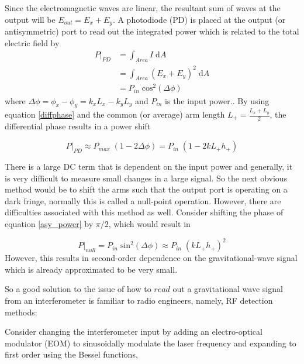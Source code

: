 		Since the electromagnetic waves are linear, the resultant sum of waves at the output will be $E_{out} = E_x + E_y$. A photodiode (PD) is placed at the output (or antisymmetric) port to read out the integrated power which is related to the total electric field by
		\begin{equation}
		\begin{aligned}\label{asy_power}
			P \vert_{PD}	&= \int_{Area} I \;				\text{d}A 
		\\					&= \int_{Area} (E_x + E_y)^2 \;	\text{d}A 
		\\					&= P_{in} \; \text{cos}^2(\Delta \phi)
		\end{aligned}
		\end{equation}	
		where $\Delta \phi = \phi_{x} - \phi_{y} = k_x L_x - k_y L_y$ and $P_{in}$ is the input power.. By using equation \ref{diffphase} and the common (or average) arm length $L_{+} = \frac{L_x + L_y}{2}$, the differential phase results in a power shift
		
		\begin{equation}
		P \vert_{PD} \approx P_{max} \; (1-2 \Delta \phi) = P_{in} \; (1-2 k L_{+} h_{+})
		\end{equation}
		
		There is a large DC term that is dependent on the input power and generally, it is very difficult to measure small changes in a large signal. So the next obvious method would be to shift the arms such that the output port is operating on a dark fringe, normally this is called a null-point operation.  However, there are difficulties associated with this method as well.  Consider shifting the phase of equation \ref{asy_power} by $\pi/2$, which would result in
		
		\begin{equation}\label{null}
		P \vert_{null} = P_{in} \; \text{sin}^2 (\Delta \phi) \approx P_{in} \; (k L_{+} h_{+})^2 
		\end{equation}
		However, this results in second-order dependence on the gravitational-wave signal which is already approximated to be very small.
		
		So a good solution to the issue of how to $read$ out a gravitational wave signal from an interferometer is familiar to radio engineers, namely, RF detection methods:
		
		Consider changing the interferometer input by adding an electro-optical modulator (EOM) to sinusoidally modulate the laser frequency and expanding to first order using the Bessel functions,
		
